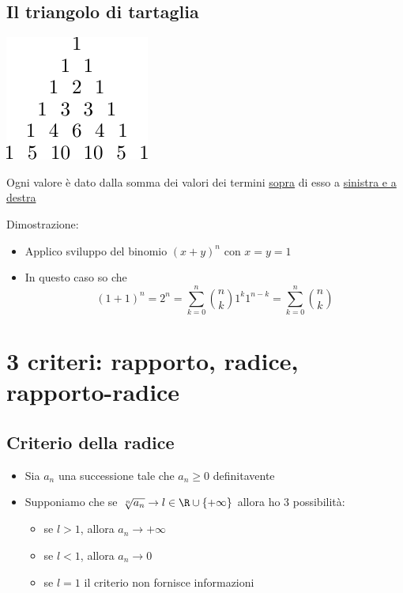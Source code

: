 \subsection{Il triangolo di tartaglia}
\begin{center}
	\includegraphics{Images/Tartaglia.pdf}
\end{center}
Ogni valore è dato dalla somma dei valori dei termini \underline{sopra} di esso a \underline{sinistra e a destra}

Dimostrazione:
\begin{itemize}
	\item Applico sviluppo del binomio $\left( x+y \right) ^{n}$ con $x=y=1$
	\item In questo caso so che \[
		      \left( 1+1 \right) ^{n} = 2^{n}= \sum_{k=0}^{n} \binom{n}{k}1^{k}1^{n-k}= \sum_{k=0}^{n} \binom{n}{k}
	      \]
\end{itemize}
\section{3 criteri: rapporto, radice, rapporto-radice}
\subsection{Criterio della radice}
\begin{itemize}
	\item Sia $a_n$ una successione tale che $a_n \ge 0 $ definitavente
	\item Supponiamo che se $\sqrt[n]{a_n} \to l \in  \R \cup \left\{ +\infty \right\} $ allora ho 3 possibilità:
	      \begin{itemize}
		      \item se $l > 1$, allora $ a_n \to +\infty$
		      \item se $l < 1$, allora $a_n \to 0$
		      \item se  $l=1$ il criterio non fornisce informazioni
	      \end{itemize}
\end{itemize}
